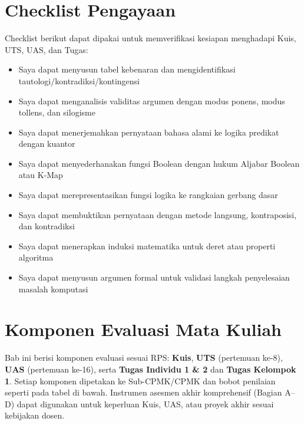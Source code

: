 \documentclass[../main]{subfiles}
\begin{document}
\section*{Checklist Pengayaan}

Checklist berikut dapat dipakai untuk memverifikasi kesiapan menghadapi Kuis, UTS, UAS, dan Tugas:
\begin{itemize}[label=$\square$]
  \item Saya dapat menyusun tabel kebenaran dan mengidentifikasi tautologi/kontradiksi/kontingensi
  \item Saya dapat menganalisis validitas argumen dengan modus ponens, modus tollens, dan silogisme
  \item Saya dapat menerjemahkan pernyataan bahasa alami ke logika predikat dengan kuantor
  \item Saya dapat menyederhanakan fungsi Boolean dengan hukum Aljabar Boolean atau K-Map
  \item Saya dapat merepresentasikan fungsi logika ke rangkaian gerbang dasar
  \item Saya dapat membuktikan pernyataan dengan metode langsung, kontraposisi, dan kontradiksi
  \item Saya dapat menerapkan induksi matematika untuk deret atau properti algoritma
  \item Saya dapat menyusun argumen formal untuk validasi langkah penyelesaian masalah komputasi
\end{itemize}


\section{Komponen Evaluasi Mata Kuliah}

Bab ini berisi komponen evaluasi sesuai RPS: \textbf{Kuis}, \textbf{UTS} (pertemuan ke-8), \textbf{UAS} (pertemuan ke-16), serta \textbf{Tugas Individu 1 \& 2} dan \textbf{Tugas Kelompok 1}. Setiap komponen dipetakan ke Sub-CPMK/CPMK dan bobot penilaian seperti pada tabel di bawah. Instrumen asesmen akhir komprehensif (Bagian A--D) dapat digunakan untuk keperluan Kuis, UAS, atau proyek akhir sesuai kebijakan dosen.
\end{document}
